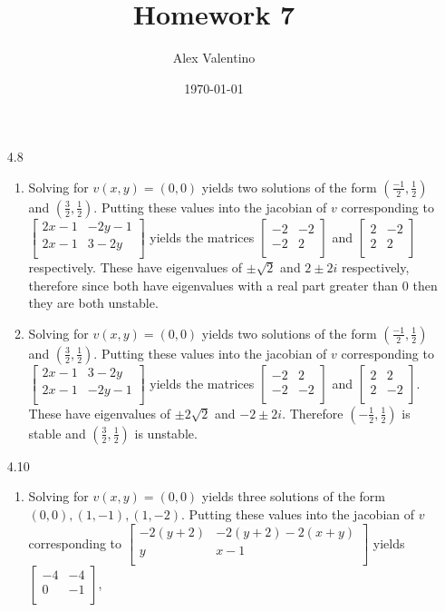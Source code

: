 \documentclass[12pt, letterpaper]{article}
\date{\today}
\author{Alex Valentino}
\title{Homework 7}
\begin{document}
	\begin{enumerate}
		\item[4.8]
		\begin{enumerate}
			\item Solving for $v(x,y) = (0,0)$ yields two solutions of the form $(\frac{-1}{2},\frac{1}{2})$ and $(\frac{3}{2},\frac{1}{2})$.  Putting these values into the jacobian of $v$ corresponding to $\begin{bmatrix} 2 x-1 & -2 y-1 \\ 2 x-1 & 3-2 y \\\end{bmatrix}$ yields the matrices $\begin{bmatrix} -2 & -2 \\ -2 & 2 \\ \end{bmatrix}$ and $\begin{bmatrix} 2 & -2 \\ 2 & 2 \\ \end{bmatrix}$ respectively.  These have eigenvalues of $\pm \sqrt{2}$ and $2 \pm 2 i$ respectively, therefore since both have eigenvalues with a real part greater than 0 then they are both unstable.  
			\item Solving for $v(x,y) = (0,0)$ yields two solutions of the form  $(\frac{-1}{2},\frac{1}{2})$ and $(\frac{3}{2},\frac{1}{2})$. Putting these values into the jacobian of $v$ corresponding to $\begin{bmatrix} 2 x-1 & 3-2 y \\ 2 x-1 &  -2 y-1 \\\end{bmatrix}$ yields the matrices $\begin{bmatrix} -2 & 2 \\ -2 & -2 \\ \end{bmatrix}$ and $\begin{bmatrix} 2 & 2 \\ 2 & -2 \\ \end{bmatrix}$.  These have eigenvalues of $\pm 2 \sqrt{2}$ and $-2\pm 2 i$.  Therefore $(-\frac{1}{2},\frac{1}{2})$ is stable and $(\frac{3}{2},\frac{1}{2})$ is unstable.  
		\end{enumerate}
		\item[4.10]
		\begin{enumerate}
			\item 		 Solving for $v(x,y) = (0,0)$ yields three solutions of the form $(0,0), (1,-1), (1,-2)$.  Putting these values into the jacobian of $v$ corresponding to $\begin{bmatrix} -2 (y+2) & -2 (y+2)-2 (x+y) \\ y & x-1 \\ \end{bmatrix}$ yields $\begin{bmatrix}  -4 & -4 \\ 0 & -1 \\\end{bmatrix}$,

\end{enumerate}
\end{enumerate}
\end{document}
